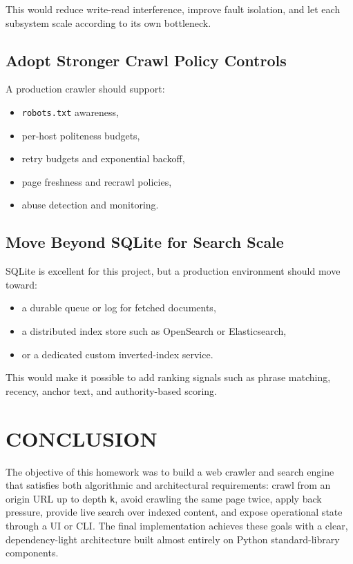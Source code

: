 \documentclass[pdftex,12pt,a4paper]{article}
\begin{document}
This would reduce write-read interference, improve fault isolation, and let each subsystem scale according to its own bottleneck.

\subsection{Adopt Stronger Crawl Policy Controls}

A production crawler should support:

\begin{itemize}
    \item \texttt{robots.txt} awareness,
    \item per-host politeness budgets,
    \item retry budgets and exponential backoff,
    \item page freshness and recrawl policies,
    \item abuse detection and monitoring.
\end{itemize}

\subsection{Move Beyond SQLite for Search Scale}

SQLite is excellent for this project, but a production environment should move toward:

\begin{itemize}
    \item a durable queue or log for fetched documents,
    \item a distributed index store such as OpenSearch or Elasticsearch,
    \item or a dedicated custom inverted-index service.
\end{itemize}

This would make it possible to add ranking signals such as phrase matching, recency, anchor text, and authority-based scoring.

\section{CONCLUSION}

The objective of this homework was to build a web crawler and search engine that satisfies both algorithmic and architectural requirements: crawl from an origin URL up to depth \texttt{k}, avoid crawling the same page twice, apply back pressure, provide live search over indexed content, and expose operational state through a UI or CLI. The final implementation achieves these goals with a clear, dependency-light architecture built almost entirely on Python standard-library components.
\end{document}
